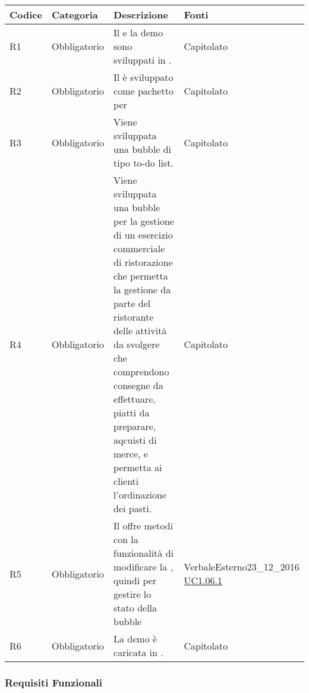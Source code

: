 \begin{longtable}{|P{1.5cm}|P{3cm}|P{6cm}|P{2.5cm}|}
	\hline \textbf{Codice} & \textbf{Categoria} & \textbf{Descrizione} & \textbf{Fonti} \\
	\hline R1 & Obbligatorio & Il  e la demo sono sviluppati in . & Capitolato \\
	\hline R2 & Obbligatorio & Il  è sviluppato come pachetto per  & Capitolato \\
	\hline R3 & Obbligatorio & Viene sviluppata una bubble di tipo to-do list. & Capitolato \\
	\hline R4 & Obbligatorio & Viene sviluppata una bubble per la gestione di un esercizio commerciale di ristorazione che permetta la gestione da parte del ristorante delle attività da svolgere che comprendono consegne da effettuare,  piatti da preparare, aqcuisti di merce, e permetta ai clienti l’ordinazione dei pasti. & Capitolato \\
	\hline R5 & Obbligatorio & Il  offre metodi con la funzionalità di modificare la , quindi per gestire lo stato della bubble & VerbaleEsterno23\_12\_2016 \linebreak \hyperref[UC1.06.1]{UC1.06.1}  \\
	\hline R6 & Obbligatorio & La demo è caricata in . & Capitolato \\
	\hline
\end{longtable}

\subsubsection{Requisiti Funzionali}

